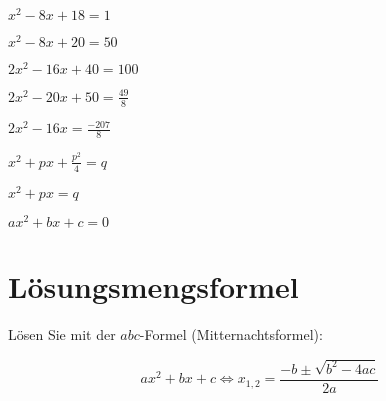 \begin{bbwAufgabenBlock}
\item $ x^2 -8x + 18 = 1$
\LoesungsBlock{$\lx = \left\{ \right\}$}

\item $x^2-8x+20 = 50  $

\item $ 2x^2 -16x + 40 = 100$

\item $ 2x^2 - 20x + 50 = \frac{49}{8} $

\item $ 2x^2 - 16 x= \frac{-207}{8}$

\item $ x^2 + px + \frac{p^2}{4}= q$

\item $ x^2 + px =  q$

\item $ ax^2+bx+c=0 $


\end{bbwAufgabenBlock}
\newpage


\section{Lösungsmengsformel}
Lösen Sie mit der $abc$-Formel (Mitternachtsformel):

$$ax^2+bx+c \Longleftrightarrow x_{1,2}=\frac{-b\pm\sqrt{b^2-4ac}}{2a}$$

